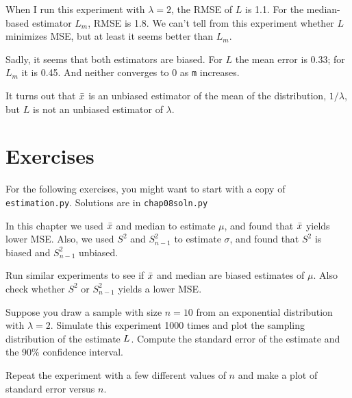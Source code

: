 \documentclass[12pt]{book}
\begin{document}
When I run this experiment with $\lambda=2$, the RMSE of $L$ is
1.1.  For the median-based estimator $L_m$, RMSE is 1.8.  We can't
tell from this experiment whether $L$ minimizes MSE, but at least
it seems better than $L_m$.

Sadly, it seems that both estimators are biased.  For $L$ the mean
error is 0.33; for $L_m$ it is 0.45.  And neither converges to 0
as {\tt m} increases.

It turns out that $\bar{x}$ is an unbiased estimator of the mean
of the distribution, $1 / \lambda$, but $L$ is not an unbiased
estimator of $\lambda$.


\section{Exercises}

For the following exercises, you might want to start with a copy of
{\tt estimation.py}.  Solutions are in \verb"chap08soln.py"

\begin{exercise}

In this chapter we used $\bar{x}$ and median to estimate $\mu$, and
found that $\bar{x}$  yields lower MSE.
Also, we used $S^2$ and $S_{n-1}^2$ to estimate $\sigma$, and found that
$S^2$ is biased and $S_{n-1}^2$ unbiased.

Run similar experiments to see if $\bar{x}$ and median are biased estimates
of $\mu$.
Also check whether $S^2$ or $S_{n-1}^2$ yields a lower MSE.

\end{exercise}


\begin{exercise}

Suppose you draw a sample with size $n=10$ from 
an exponential distribution with $\lambda=2$.  Simulate
this experiment 1000 times and plot the sampling distribution of
the estimate $L$.  Compute the standard error of the estimate
and the 90\% confidence interval.

Repeat the experiment with a few different values of $n$ and make
a plot of standard error versus $n$.


\end{exercise}
\end{document}
